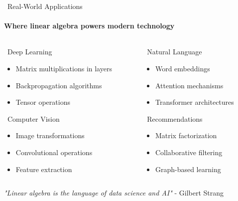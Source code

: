 \documentclass[12pt,aspectratio=169]{beamer}
\begin{document}
\begin{frame}{\faLightbulb \, Real-World Applications}
\framesubtitle{Where linear algebra powers modern technology}

\begin{columns}[T]
    \begin{column}{0.45\textwidth}
        \begin{block}{\faRobot \, Deep Learning}
            \begin{itemize}
                \item Matrix multiplications in layers
                \item Backpropagation algorithms
                \item Tensor operations
            \end{itemize}
        \end{block}
        
        \begin{block}{\faSearch \, Computer Vision}
            \begin{itemize}
                \item Image transformations
                \item Convolutional operations
                \item Feature extraction
            \end{itemize}
        \end{block}
    \end{column}
    
    \begin{column}{0.45\textwidth}
        \begin{block}{\faComments \, Natural Language}
            \begin{itemize}
                \item Word embeddings
                \item Attention mechanisms
                \item Transformer architectures
            \end{itemize}
        \end{block}
        
        \begin{block}{\faUsers \, Recommendations}
            \begin{itemize}
                \item Matrix factorization
                \item Collaborative filtering
                \item Graph-based learning
            \end{itemize}
        \end{block}
    \end{column}
\end{columns}

\vspace{0.5cm}
\centering
\textit{"Linear algebra is the language of data science and AI"} - Gilbert Strang
\end{frame}
\end{document}
